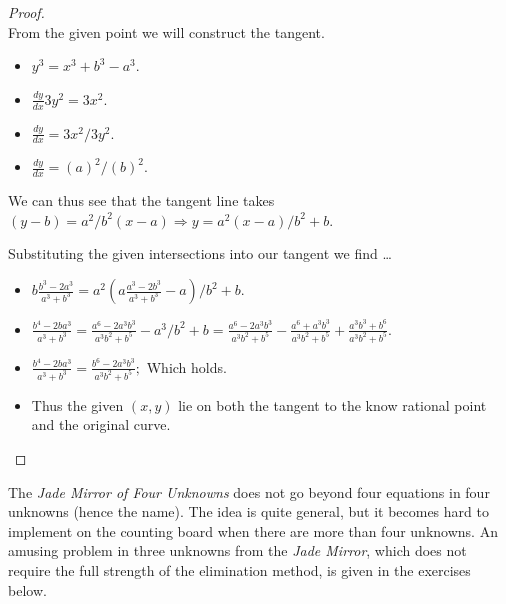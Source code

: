 \documentclass[12pt]{article}
\newcommand{\ds}{\displaystyle}
\theoremstyle{plain}
\begin{document}
\begin{proof}
  \ \\

  From the given point we will construct the tangent. 

  \begin{itemize}
    \item $ \ds y^{3} = x^{3} + b^{3} - a^{3} $.
    \item $ \ds \frac{dy}{dx} 3y^{2} = 3x^{2} $.
    \item $ \ds \frac{dy}{dx} = 3x^{2} / 3y^{2} $.
    \item $ \ds \frac{dy}{dx} = (a)^{2} / (b)^{2} $.
  \end{itemize}

  We can thus see that the tangent line takes $ (y - b) = a^{2} / b^{2} (x - a) \Rightarrow y = a^{2}(x - a) / b^{2}  + b $. 

  Substituting the given intersections into our tangent we find \dots

  \begin{itemize}
    \item $ \ds b\frac{b^{3} - 2a^{3}}{a^{3} + b^{3}} = a^{2}(a\frac{a^{3} - 2b^{3}}{a^{3} + b^{3}} - a) / b^{2}  + b $.
    \item $ \ds \frac{b^{4} - 2ba^{3}}{a^{3} + b^{3}} = \frac{a^{6} - 2a^{3}b^{3}}{a^{3}b^{2} + b^{5}} - a^{3}/b^{2} + b = \frac{a^{6} - 2a^{3}b^{3}}{a^{3}b^{2} + b^{5}} - \frac{a^{6} + a^{3}b^{3}}{a^{3}b^{2} + b^{5}} + \frac{a^{3}b^{3} + b^{6}}{a^{3}b^{2} + b^{5}} $.
    \item $ \ds \frac{b^{4} - 2ba^{3}}{a^{3} + b^{3}} = \frac{b^{6} - 2a^{3}b^{3}}{a^{3}b^{2} + b^{5}} ; $ Which holds.   
    \item Thus the given $ (x, y) $ lie on both the tangent to the know rational point and the original curve.

  \end{itemize} 

\end{proof}

\newpage

The \emph{Jade Mirror of Four Unknowns} does not go beyond four equations in four unknowns (hence the name). The idea is quite general, but it becomes hard to implement on the counting board when there are more than four unknowns. An amusing problem in three unknowns from the \emph{Jade Mirror}, which does not require the full strength of the elimination method, is given in the exercises below.

\end{document}

